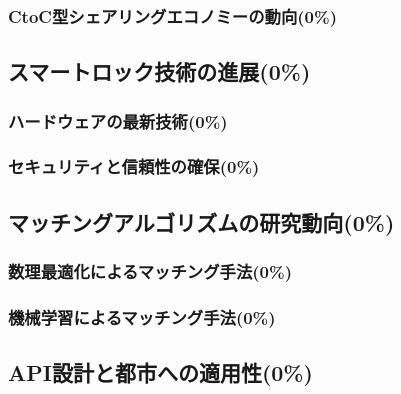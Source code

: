       \subsubsection{CtoC型シェアリングエコノミーの動向(0\%)}
        \label{sec:CtoC型シェアリングエコノミーの動向}
          \par 
      
  \subsection{スマートロック技術の進展(0\%)}
    \label{sec:スマートロック技術の進展}
      \par
      
      \subsubsection{ハードウェアの最新技術(0\%)}
        \label{sec:ハードウェアの最新技術}
          \par
          
      \subsubsection{セキュリティと信頼性の確保(0\%)}
        \label{sec:セキュリティと信頼性の確保}
          \par  
  
  \subsection{マッチングアルゴリズムの研究動向(0\%)}
    \label{sec:マッチングアルゴリズムの研究動向}
      \par 
      
      \subsubsection{数理最適化によるマッチング手法(0\%)}
        \label{sec:数理最適化によるマッチング手法}
          \par
          
      \subsubsection{機械学習によるマッチング手法(0\%)}
        \label{sec:機械学習によるマッチング手法}
          \par    
          
  \subsection{API設計と都市への適用性(0\%)}
    \label{sec:API設計と都市への適用性}
      \par 
